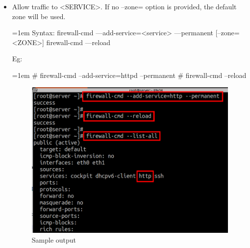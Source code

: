 \begin{flushleft}
\begin{itemize}
		\bigskip
		\bigskip
		
		\item Allow traffic to <SERVICE>. If no --zone= option is provided, the default zone will be used.
		\bigskip
		\begin{tcolorbox}[breakable,notitle,boxrule=1pt,colback=pink,colframe=pink]
			\color{black}
			\font=1em
			Syntax: 
			\newline
			firewall-cmd ---add-service=<service> ---permanent [--zone=<ZONE>]
			\newline
			\newline
			firewall-cmd ---reload
			\font=4pt
		\end{tcolorbox}	
		Eg:
		\begin{tcolorbox}[breakable,notitle,boxrule=-0pt,colback=black,colframe=black]
			\color{green}
			\font=1em
			\# firewall-cmd --add-service=httpd --permanent 
			\newline
			\# firewall-cmd --reload
			\font=4pt
		\end{tcolorbox}
		\begin{figure}[h!]
			\centering
			\includegraphics[scale=0.4]{content/chapter2/images/zones6.png}
			\caption{Sample output}
			\label{fig:zones6}
		\end{figure}
		\newpage
		

\end{itemize}
\end{flushleft}
